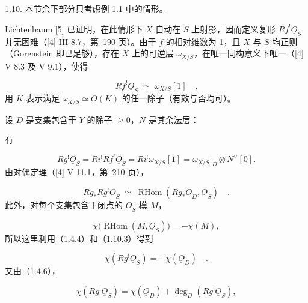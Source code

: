 
1.10. \underline{本节余下部分只考虑例 1.1 中的情形。}

Lichtenbaum [5] 已证明，在此情形下 $X$ 自动在 $S$ 上射影，因而定义复形 $Rf^{!}\underline{O}_S$ 并无困难（[4] III 8.7，第~190 页）。由于 $f$ 的相对维数为 1，且 $X$ 与 $S$ 均正则（Gorenstein 即已足够），存在 $X$ 上的可逆层 $\omega_{X/S}$，在唯一同构意义下唯一（[4] V 8.3 及 V 9.1），使得

\begin{equation}\tag{1.10.1}
Rf^{!}\underline{O}_S \;\simeq\; \omega_{X/S}[1] \quad .
\end{equation}
用 $K$ 表示满足 $\omega_{X/S}\simeq\underline{O}(K)$ 的任一除子（有效与否均可）。

设 $D$ 是支集包含于 $Y$ 的除子 $\geq0$，$N$ 是其余法层：

\begin{center}
\end{center}
有

\begin{equation}\tag{1.10.2}
Rg^{!}\underline{O}_S
=Ri^{!}Rf^{!}\underline{O}_S
=Ri^{!}\omega_{X/S}[1]
=\omega_{X/S}\big|_D\otimes N^{\vee}[0].
\end{equation}
由对偶定理（[4] V 11.1，第~210 页），

\begin{equation}\tag{1.10.3}
Rg_*Rg^{!}\underline{O}_S
\;\simeq\;
\operatorname{RHom}(Rg_*\underline{O}_D,\underline{O}_S) \quad .
\end{equation}
此外，对每个支集包含于闭点的 $\underline{O}_S$-模 $M$，

\begin{equation}\tag{1.10.4}
\chi\bigl(\operatorname{RHom}(M,\underline{O}_S)\bigr)=-\chi(M),
\end{equation}
所以这里利用（1.4.4）和（1.10.3）得到

\begin{equation*}
\chi(Rg^{!}\underline{O}_S)=-\chi(\underline{O}_D) \quad .
\end{equation*}
又由（1.4.6），

\begin{equation*}
\chi(Rg^{!}\underline{O}_S)
=\chi(\underline{O}_D)+\deg_D(Rg^{!}\underline{O}_S),
\end{equation*}

